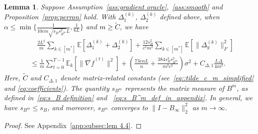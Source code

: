 \documentclass[10pt]{article}
\newcommand{\EE}{\mathbb{E}}
\newcommand{\norm}[1]{\| #1 \|}
\newcommand{\revision}[1]{\textcolor{black}{#1}}
\newtheorem{lemma}[thm]{Lemma}
\begin{document}
\begin{lemma}\label{lem:consensus error}
    Suppose Assumption~\ref{ass:gradient oracle},~\ref{ass:smooth} and Proposition~\ref{prop:perron} hold. With $\Delta_1^{(k)}$, $\Delta_2^{(k)}$ defined above, when $\alpha\le \min\{\frac{1}{10cm\sqrt{s_Bs_{B^m}^2}L},\frac{1}{6L}\}$ and \revision{$m\ge \tilde{C}$}, we have
    \begin{align*}
     &\quad\frac{2 L^2}{m}\sum_{k\in [m^*]}\EE[\Delta_1^{(k)}+\Delta_2^{(k)}]+\frac{12 s_B^2}{c^2m^2}\sum_{k\in [m^*]}\EE[\norm{\Delta_y^{(k)}}_F^2] \\
     &\le \frac{1}{m}\sum_{t=0}^{T-1}\EE_k[\norm{\overline{\nabla f}^{(t)}}^2]+(\frac{73c\alpha L}{n}+\frac{384s_B^3s_{B^m}^2}{m^2c^2})\sigma^2 + C_{\Delta,1}\frac{ L\Delta}{4m^2}.
\end{align*}
Here, \revision{$\tilde{C}$} and $C_{\Delta,1}$ denote matrix-related constants (see~\eqref{eq::tilde_c_m_simplified} and \eqref{eq:coefficients}).  
The quantity $s_{B^m}$ represents the matrix measure of $B^m$, as defined in~\eqref{eq:s_B definition} and ~\eqref{eq:s_B^m_def_in_appendix}.  
In general, we have $s_{B^m} \leq s_{B}$, and moreover, $s_{B^m}$ converges to $\lVert I - B_\infty \rVert_2^2$ as $m \to \infty$.
\end{lemma}
\begin{proof}
    See Appendix~\ref{app:subsec:lem 4.4}.
\end{proof}
\end{document}
